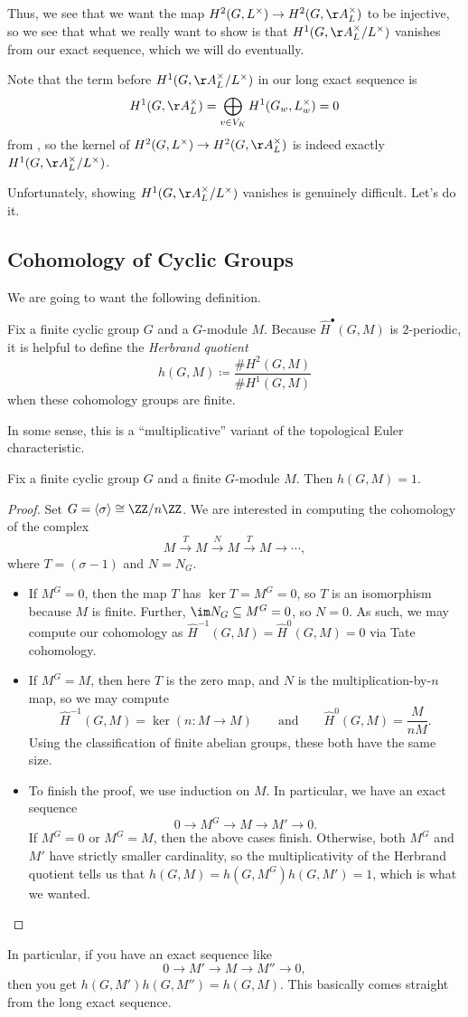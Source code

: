 \documentclass[../notes.tex]{subfiles}
\begin{document}
Thus, we see that we want the map $H^2(G,L^\times)\to H^2(G,\AA_L^\times)$ to be injective, so we see that what we really want to show is that $H^1(G,\AA_L^\times/L^\times)$ vanishes from our exact sequence, which we will do eventually.
\begin{remark}
	Note that the term before $H^1(G,\AA_L^\times/L^\times)$ in our long exact sequence is
	\[H^1(G,\AA_L^\times)=\bigoplus_{v\in V_K}H^1(G_w,L_w^\times)=0\]
	from , so the kernel of $H^2(G,L^\times)\to H^2(G,\AA_L^\times)$ is indeed exactly $H^1(G,\AA_L^\times/L^\times)$.
\end{remark}
Unfortunately, showing $H^1(G,\AA_L^\times/L^\times)$ vanishes is genuinely difficult. Let's do it.

\subsection{Cohomology of Cyclic Groups}
We are going to want the following definition.
\begin{definition}
	Fix a finite cyclic group $G$ and a $G$-module $M$. Because $\widehat H^\bullet(G,M)$ is $2$-periodic, it is helpful to define the \textit{Herbrand quotient}
	\[h(G,M)\coloneqq\frac{\#H^2(G,M)}{\#H^1(G,M)}\]
	when these cohomology groups are finite.
\end{definition}
\begin{remark}
	In some sense, this is a ``multiplicative'' variant of the topological Euler characteristic.
\end{remark}
\begin{lemma}
	Fix a finite cyclic group $G$ and a finite $G$-module $M$. Then $h(G,M)=1$.
\end{lemma}
\begin{proof}
	Set $G=\langle\sigma\rangle\cong\ZZ/n\ZZ$. We are interested in computing the cohomology of the complex
	\[M\xrightarrow{T}M\xrightarrow{N}M\xrightarrow{T}M\to\cdots,\]
	where $T=(\sigma-1)$ and $N=N_G$.
	\begin{itemize}
		\item If $M^G=0$, then the map $T$ has $\ker T=M^G=0$, so $T$ is an isomorphism because $M$ is finite. Further, $\im N_G\subseteq M^G=0$, so $N=0$. As such, we may compute our cohomology as $\widehat H^{-1}(G,M)=\widehat H^0(G,M)=0$ via Tate cohomology.
		\item If $M^G=M$, then here $T$ is the zero map, and $N$ is the multiplication-by-$n$ map, so we may compute
		\[\widehat H^{-1}(G,M)=\ker(n\colon M\to M)\qquad\text{and}\qquad\widehat H^0(G,M)=\frac{M}{nM}.\]
		Using the classification of finite abelian groups, these both have the same size.
		\item To finish the proof, we use induction on $M$. In particular, we have an exact sequence
		\[0\to M^G\to M\to M'\to0.\]
		If $M^G=0$ or $M^G=M$, then the above cases finish. Otherwise, both $M^G$ and $M'$ have strictly smaller cardinality, so the multiplicativity of the Herbrand quotient tells us that $h(G,M)=h(G,M^G)h(G,M')=1$, which is what we wanted.
		\qedhere
	\end{itemize}
\end{proof}
\begin{remark}
	In particular, if you have an exact sequence like
	\[0\to M'\to M\to M''\to0,\]
	then you get $h(G,M')h(G,M'')=h(G,M)$. This basically comes straight from the long exact sequence.
\end{remark}
\end{document}
